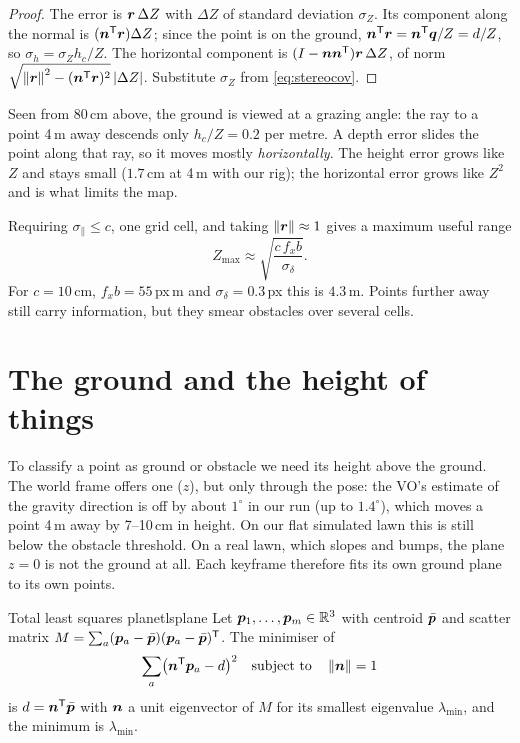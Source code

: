 \begin{proof}
The error is $\bm{r}\,\Delta Z$ with $\Delta Z$ of standard deviation
$\sigma_Z$. Its component along the normal is $(\bm{n}^{\mathsf{T}}\bm{r})
\Delta Z$; since the point is on the ground, $\bm{n}^{\mathsf{T}}\bm{r}=
\bm{n}^{\mathsf{T}}\bm{q}/Z=d/Z$, so $\sigma_h=\sigma_Zh_c/Z$. The horizontal
component is $(I-\bm{n}\bm{n}^{\mathsf{T}})\bm{r}\,\Delta Z$, of norm
$\sqrt{\left\lVert \bm{r}\right\rVert^2-(\bm{n}^{\mathsf{T}}\bm{r})^2}\,|\Delta Z|$.
Substitute $\sigma_Z$ from \eqref{eq:stereocov}.
\end{proof}

\begin{inwords}
Seen from 80\,cm above, the ground is viewed at a grazing angle: the
ray to a point 4\,m away descends only $h_c/Z=0.2$ per metre. A depth
error slides the point along that ray, so it moves mostly
\emph{horizontally}. The height error grows like $Z$ and stays small
($1.7$\,cm at 4\,m with our rig); the horizontal error grows like $Z^2$
and is what limits the map.
\end{inwords}

Requiring $\sigma_\parallel\le c$, one grid cell, and taking
$\left\lVert \bm{r}\right\rVert\approx1$ gives a maximum useful range
\begin{equation}\label{eq:maxrange}
Z_{\max}\approx\sqrt{\frac{c\,f_xb}{\sigma_\delta}} .
\end{equation}
For $c=10$\,cm, $f_xb=55$\,px\,m and $\sigma_\delta=0.3$\,px this is
$4.3$\,m. Points further away still carry information, but they smear
obstacles over several cells.

\section{The ground and the height of things}

To classify a point as ground or obstacle we need its height above the
ground. The world frame offers one ($z$), but only through the pose:
the VO's estimate of the gravity direction is off by about $1^\circ$
in our run (up to $1.4^\circ$), which moves a point 4\,m away by
7--10\,cm in height. On our flat simulated lawn this is still below
the obstacle threshold. On a real lawn, which slopes and bumps, the
plane $z=0$ is not the ground at all. Each keyframe therefore fits its
own ground plane to its own points.

\begin{proposition}{Total least squares plane}{tlsplane}
Let $\bm{p}_1,\dots,\bm{p}_m\in\mathbb{R}^3$ with centroid $\bar{\bm{p}}$
and scatter matrix $M=\sum_a(\bm{p}_a-\bar{\bm{p}})(\bm{p}_a-
\bar{\bm{p}})^{\mathsf{T}}$. The minimiser of
\begin{equation}\label{eq:tls}
\sum_a\bigl(\bm{n}^{\mathsf{T}}\bm{p}_a-d\bigr)^2\quad\text{subject to}\quad
\left\lVert \bm{n}\right\rVert=1
\end{equation}
is $d=\bm{n}^{\mathsf{T}}\bar{\bm{p}}$ with $\bm{n}$ a unit eigenvector of
$M$ for its smallest eigenvalue $\lambda_{\min}$, and the minimum is
$\lambda_{\min}$.
\end{proposition}

